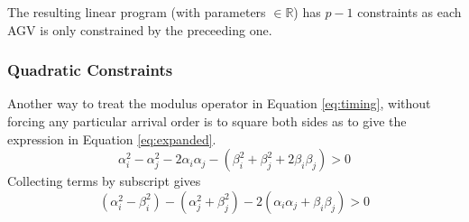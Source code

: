 The resulting linear program (with parameters $\in\mathbb{R}$) has $p-1$ constraints as each AGV is only constrained by the preceeding one.

\subsubsection{Quadratic Constraints}
\label{sec:quad_constraints}
Another way to treat the modulus operator in Equation \ref{eq:timing}, without forcing any particular arrival order is to square both sides as to give the expression in Equation \ref{eq:expanded}. 
\begin{equation}
\alpha_i^2 - \alpha_j^2 - 2 \alpha_i\alpha_j - (\beta_i^2 + \beta_j^2 +2 \beta_i \beta_j) > 0
\label{eq:expanded}
\end{equation}
Collecting terms by subscript gives
\begin{equation}
(\alpha_i^2 - \beta_i^2) - (\alpha_j^2 + \beta_j^2) - 2(\alpha_i\alpha_j + \beta_i \beta_j) > 0
\label{eq:collected}
\end{equation}

